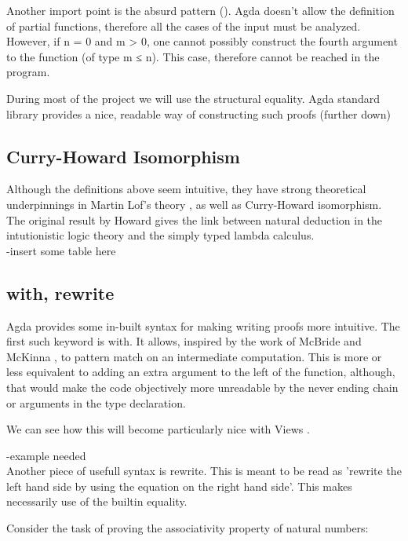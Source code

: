 \documentclass[12pt,twoside,notitlepage]{report}
\begin{document}
Another import point is the absurd pattern (). Agda doesn't allow the definition of partial functions, therefore all the cases of the
input must be analyzed. However, if n = 0 and m > 0, one cannot possibly construct the fourth argument to the function (of type m ≤ n). This case,
therefore cannot be reached in the program.

During most of the project we will use the structural equality. Agda standard library provides a nice, readable way
of constructing such proofs (further down)

\subsection{Curry-Howard Isomorphism}

Although the definitions above seem intuitive, they have strong theoretical underpinnings in Martin Lof's theory \cite{martinlof}, as well as
Curry-Howard isomorphism. The original result by Howard \cite{howard} gives the link between natural deduction in the intutionistic logic theory
and the simply typed lambda calculus. \\
-insert some table here \\

\subsection{with, rewrite}

Agda provides some in-built syntax for making writing proofs more intuitive.
The first such keyword is with. It allows, inspired by the work of McBride and McKinna \cite{viewfromtheleft},
to pattern match on an intermediate computation. This is more or less equivalent to adding an extra argument to
the left of the function, although, that would make the code objectively more unreadable by the never ending
chain or arguments in the type declaration.

We can see how this will become particularly nice with Views \cite{wadler}.

-example needed\\

Another piece of usefull syntax is rewrite. This is meant to be read as 'rewrite the left hand side
by using the equation on the right hand side'. This makes necessarily use of the builtin equality.

Consider the task of proving the associativity property of natural numbers:
\end{document}
